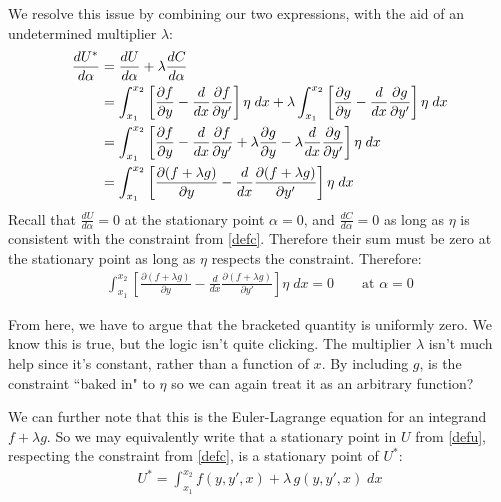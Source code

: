 \documentclass{article}
\renewenvironment{quote}{\begin{shaded*}\begin{oldquote}}{\end{oldquote}\end{shaded*}}
\begin{document}
We resolve this issue by combining our two expressions, with the aid of an undetermined multiplier $\lambda$:
\begin{align}
    \frac{dU^*}{d\alpha} &= \frac{dU}{d\alpha} + \lambda \frac{dC}{d\alpha} \notag \\
    \label{defustar}
    &= \displaystyle\int_{x_1}^{x_2} \left[ \frac{\partial f}{\partial y} - \frac{d}{dx} \frac{\partial f}{\partial y'} \right] \eta \; dx + \lambda \displaystyle\int_{x_1}^{x_2} \left[ \frac{\partial g}{\partial y} - \frac{d}{dx} \frac{\partial g}{\partial y'} \right] \eta \; dx \notag \\
    &= \displaystyle\int_{x_1}^{x_2} \left[ \frac{\partial f}{\partial y} - \frac{d}{dx} \frac{\partial f}{\partial y'} + \lambda \frac{\partial g}{\partial y} - \lambda \frac{d}{dx} \frac{\partial g}{\partial y'} \right] \eta \; dx \notag \\
    &= \displaystyle\int_{x_1}^{x_2} \left[ \frac{\partial (f + \lambda g)}{\partial y} - \frac{d}{dx} \frac{\partial (f + \lambda g)}{\partial y'} \right] \eta \; dx
\end{align}
Recall that $\tfrac{dU}{d\alpha} = 0$ at the stationary point $\alpha=0$, and $\tfrac{dC}{d\alpha}=0$ as long as $\eta$ is consistent with the constraint from \cref{defc}. Therefore their sum must be zero at the stationary point as long as $\eta$ respects the constraint. Therefore:
\begin{align}
    \displaystyle\int_{x_1}^{x_2} \left[ \frac{\partial (f + \lambda g)}{\partial y} - \frac{d}{dx} \frac{\partial (f + \lambda g)}{\partial y'} \right] \eta \; dx = 0 \quad\quad\text{at $\alpha=0$}
\end{align}
\begin{quote}
    From here, we have to argue that the bracketed quantity is uniformly zero. We know this is true, but the logic isn't quite clicking. The multiplier $\lambda$ isn't much help since it's constant, rather than a function of $x$. By including $g$, is the constraint ``baked in" to $\eta$ so we can again treat it as an arbitrary function? 
\end{quote}
We can further note that this is the Euler-Lagrange equation for an integrand $f + \lambda g$. So we may equivalently write that a stationary point in $U$ from \cref{defu}, respecting the constraint from \cref{defc}, is a stationary point of $U^*$:
\begin{align}
    U^* = \displaystyle\int_{x_1}^{x_2} f(y, y', x) + \lambda \, g(y, y', x) \; dx
\end{align}
\end{document}
